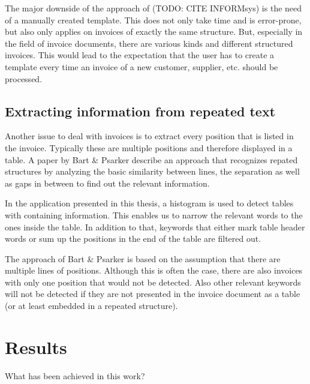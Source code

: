 The major downside of the approach of (TODO: CITE INFORMsys) is the need of a manually created template. This does not only take time and is error-prone, but also only applies on invoices of exactly the same structure. But, especially in the field of invoice documents, there are various kinds and different structured invoices. This would lead to the expectation that the user has to create a template every time an invoice of a new customer, supplier, etc. should be processed.

\subsection{Extracting information from repeated text}
Another issue to deal with invoices is to extract every position that is listed in the invoice. Typically these are multiple positions and therefore displayed in a table. A paper by Bart \& Psarker describe an approach that recognizes repated structures by analyzing the basic similarity between lines, the separation as well as gaps in between to find out the relevant information.

In the application presented in this thesis, a histogram is used to detect tables with containing information. This enables us to narrow the relevant words to the ones inside the table. In addition to that, keywords that either mark table header words or sum up the positions in the end of the table are filtered out.

The approach of Bart \& Psarker is based on the assumption that there are multiple lines of positions. Although this is often the case, there are also invoices with only one position that would not be detected. Also other relevant keywords will not be detected if they are not presented in the invoice document as a table (or at least embedded in a repeated structure).




\section{Results}
\label{sec1.5}

What has been achieved in this work?


